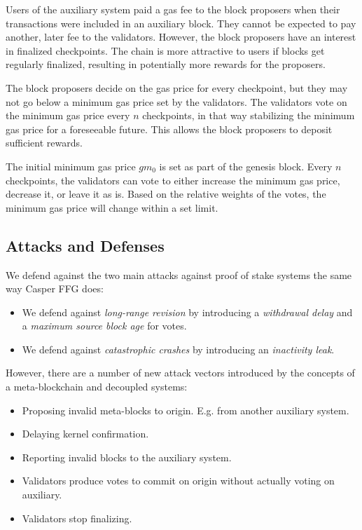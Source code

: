 \documentclass[12pt,a4paper]{article}
\begin{document}
Users of the auxiliary system paid a gas fee to the block proposers when their transactions were included in an auxiliary block.
They cannot be expected to pay another, later fee to the validators.
However, the block proposers have an interest in finalized checkpoints.
The chain is more attractive to users if blocks get regularly finalized, resulting in potentially more rewards for the proposers.

The block proposers decide on the gas price for every checkpoint, but they may not go below a minimum gas price set by the validators.
The validators vote on the minimum gas price every $n$ checkpoints, in that way stabilizing the minimum gas price for a foreseeable future.
This allows the block proposers to deposit sufficient rewards.

The initial minimum gas price $gm_0$ is set as part of the genesis block.
Every $n$ checkpoints, the validators can vote to either increase the minimum gas price, decrease it, or leave it as is.
Based on the relative weights of the votes, the minimum gas price will change within a set limit.

\subsection{Attacks and Defenses}

We defend against the two main attacks against proof of stake systems the same way Casper FFG\cite{casperffg} does:
\begin{itemize}
    \item We defend against \emph{long-range revision} by introducing a \emph{withdrawal delay} and a \emph{maximum source block age} for votes.
    \item We defend against \emph{catastrophic crashes} by introducing an \emph{inactivity leak}.
\end{itemize}
However, there are a number of new attack vectors introduced by the concepts of a meta-blockchain and decoupled systems:
\begin{itemize}
    \item Proposing invalid meta-blocks to origin. E.g. from another auxiliary system.
    \item Delaying kernel confirmation.
    \item Reporting invalid blocks to the auxiliary system.
    \item Validators produce votes to commit on origin without actually voting on auxiliary.
    \item Validators stop finalizing.
\end{itemize}
\end{document}

